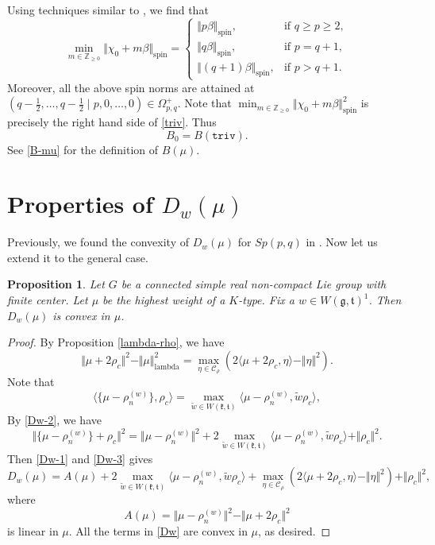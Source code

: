 \documentclass[11pt]{amsart}
\theoremstyle{plain}
\newtheorem{prop}[thm]{Proposition}
\theoremstyle{definition}
\newcommand{\mfg}{\mathfrak{g}}
\newcommand{\mfk}{\mathfrak{k}}
\newcommand{\mft}{\mathfrak{t}}
\newcommand{\bbZ}{\mathbb{Z}}
\newcommand{\C}{\mathcal{C}}
\begin{document}
Using techniques similar to \cite{DY},  we find that
 \[
 \min_{m\in\bbZ_{\ge 0}}\Vert \chi_0+m\beta\Vert_{\mathrm{spin}}=\left\{
 \begin{array}{ll}
 	\Vert p\beta\Vert_{\mathrm{spin}}, & \mbox{if $q\ge p\ge 2$},\\
 	\Vert q\beta\Vert_{\mathrm{spin}}, & \mbox{if $p=q+1$},\\
 	\Vert (q+1)\beta\Vert_{\mathrm{spin}}, & \mbox{if $p>q+1$}.
 \end{array}
 \right.
 \]
Moreover, all the above spin norms are  attained at $(q-\frac{1}{2},\dots,q-\frac{1}{2}\mid p,0,\dots,0)\in\Omega_{p, q}^+$. Note that  $\min_{m\in\bbZ_{\ge 0}}\Vert \chi_0+m\beta\Vert_{\mathrm{spin}}^2$ is precisely the right hand side of \eqref{triv}. Thus
\begin{equation}\label{B0-explanation}
B_0=B(\texttt{triv}).
\end{equation}
See \eqref{B-mu} for the definition of $B(\mu)$.

\section{Properties of $D_w(\mu)$}\label{sec-Dw-mu}

Previously, we found the convexity of $D_w(\mu)$ for $Sp(p, q)$ in \cite{DY2}. Now let us extend it to the general case.

\begin{prop}\label{DW} Let $G$ be a connected simple real non-compact Lie group with finite center.
	  Let $\mu$ be the highest weight of a $K$-type. Fix a $w\in W(\mfg,\mft)^1$. Then $D_{w}(\mu)$ is convex in $\mu$.
\end{prop}
\begin{proof}
	By Proposition \ref{lambda-rho}, we have
	\begin{equation}\label{Dw-1}
		\Vert\mu+2\rho_c\Vert^2-\Vert\mu\Vert_{\mathrm{lambda}}^2=\max_{\eta\in \C_\rho}(2\langle \mu+2\rho_c,\eta\rangle-\Vert\eta\Vert^2).
	\end{equation}
	Note that
	\begin{equation}\label{Dw-2}
		\langle \{\mu-\rho_n^{(w)}\},\rho_c\rangle =\max_{\widetilde{w}\in W(\mfk,\mft)}\langle \mu-\rho_n^{(w)},\widetilde{w}\rho_c\rangle,
	\end{equation}
	By \eqref{Dw-2}, we have
	\begin{equation}\label{Dw-3}
		\Vert \{\mu-\rho_n^{(w)}\}+\rho_c\Vert^2=\Vert\mu-\rho_n^{(w)}\Vert^2+2\max_{\widetilde{w}\in W(\mfk,\mft)}\langle \mu-\rho_n^{(w)},\widetilde{w}\rho_c\rangle+\Vert \rho_c\Vert^2.
	\end{equation}
	Then \eqref{Dw-1} and \eqref{Dw-3} gives
	\begin{equation}\label{Dw}
		D_w(\mu)=A(\mu)+2\max_{\widetilde{w}\in W(\mfk,\mft)}\langle \mu-\rho_n^{(w)},\widetilde{w}\rho_c\rangle+\max_{\eta\in \C_\rho}(2\langle \mu+2\rho_c,\eta\rangle-\Vert\eta\Vert^2)+\Vert \rho_c\Vert^2,
	\end{equation}
where
$$
A(\mu)=\Vert\mu-\rho_n^{(w)}\Vert^2-\Vert\mu+2\rho_c\Vert^2
$$
is linear in $\mu$. All the  terms in \eqref{Dw} are convex in $\mu$, as desired.
\end{proof}
\end{document}
